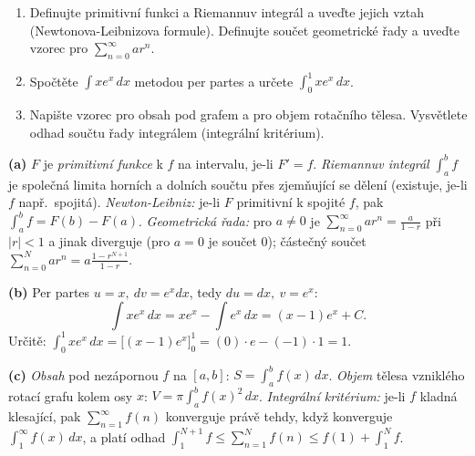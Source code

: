 \begin{zadani}
\begin{enumerate}[label=(\alph*)]
  \item {} Definujte primitivní funkci a Riemannuv integrál a uveďte jejich vztah (Newtonova-Leibnizova formule). Definujte součet geometrické řady a uveďte vzorec pro $\sum_{n=0}^\infty ar^n$.
  \item {} Spočtěte $\displaystyle\int x e^{x}\,dx$ metodou per partes a určete $\displaystyle\int_0^1 x e^{x}\,dx$.
  \item {} Napište vzorec pro obsah pod grafem a pro objem rotačního tělesa. Vysvětlete odhad součtu řady integrálem (integrální kritérium).
\end{enumerate}
\end{zadani}

\begin{reseni}
\textbf{(a)} $F$ je \emph{primitivní funkce} k $f$ na intervalu, je-li $F'=f$. \emph{Riemannuv integrál} $\int_a^b f$ je společná limita horních a dolních součtu přes zjemňující se dělení (existuje, je-li $f$ např.\ spojitá). \emph{Newton-Leibniz:} je-li $F$ primitivní k spojité $f$, pak $\int_a^b f = F(b)-F(a)$. \emph{Geometrická řada:} pro $a\neq0$ je $\sum_{n=0}^\infty ar^n=\frac{a}{1-r}$ při $|r|<1$ a jinak diverguje (pro $a=0$ je součet $0$); částečný součet $\sum_{n=0}^{N}ar^n=a\frac{1-r^{N+1}}{1-r}$.

\textbf{(b)} Per partes $u=x,\ dv=e^x dx$, tedy $du=dx,\ v=e^x$:
\[
\int x e^x\,dx = x e^x-\int e^x\,dx = (x-1)e^x + C.
\]
Určitě: $\int_0^1 x e^x\,dx=\big[(x-1)e^x\big]_0^1=(0)\cdot e-(-1)\cdot 1 = 1.$

\textbf{(c)} \emph{Obsah} pod nezápornou $f$ na $[a,b]$: $S=\int_a^b f(x)\,dx$. \emph{Objem} tělesa vzniklého rotací grafu kolem osy $x$: $V=\pi\int_a^b f(x)^2\,dx$. \emph{Integrální kritérium:} je-li $f$ kladná klesající, pak $\sum_{n=1}^\infty f(n)$ konverguje právě tehdy, když konverguje $\int_1^\infty f(x)\,dx$, a platí odhad $\int_1^{N+1}f \le \sum_{n=1}^{N} f(n) \le f(1)+\int_1^{N} f$.
\end{reseni}

